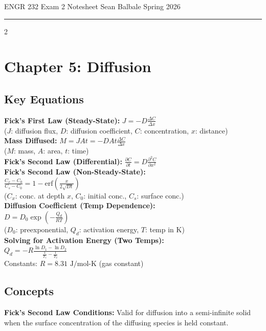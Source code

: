 \documentclass[8pt]{article}
\date{}
\begin{document}
\large ENGR 232 Exam 2 Notesheet \hfill Sean Balbale \hfill Spring 2026 \vspace{0.1cm}
\hrule
\vspace{0.1cm}

\begin{multicols*}{2}

  \section*{Chapter 5: Diffusion}
  \subsection*{Key Equations}
  \textbf{Fick's First Law (Steady-State):} \( J = -D \frac{\Delta C}{\Delta x} \) \\
  (\( J \): diffusion flux, \( D \): diffusion coefficient, \( C \): concentration, \( x \): distance) \\

  \textbf{Mass Diffused:} \( M = JAt = -DAt\frac{\Delta C}{\Delta x} \) \\
  (\( M \): mass, \( A \): area, \( t \): time) \\

  \textbf{Fick's Second Law (Differential):} \( \frac{\partial C}{\partial t} = D \frac{\partial^2 C}{\partial x^2} \) \\

  \textbf{Fick's Second Law (Non-Steady-State):} \\
  \( \frac{C_x - C_0}{C_s - C_0} = 1 - \text{erf}\left(\frac{x}{2\sqrt{Dt}}\right) \) \\
  (\( C_x \): conc. at depth \( x \), \( C_0 \): initial conc., \( C_s \): surface conc.) \\

  \textbf{Diffusion Coefficient (Temp Dependence):} \\
  \( D = D_0 \exp\left(-\frac{Q_d}{RT}\right) \) \\
  (\( D_0 \): preexponential, \( Q_d \): activation energy, \( T \): temp in K) \\

  \textbf{Solving for Activation Energy (Two Temps):} \\
  \( Q_d = -R \frac{\ln D_1 - \ln D_2}{\frac{1}{T_1} - \frac{1}{T_2}} \) \\
  Constants: \( R = 8.31 \text{ J/mol-K} \) (gas constant)

  \subsection*{Concepts}
  \textbf{Fick's Second Law Conditions:} Valid for diffusion into a semi-infinite solid when the surface concentration of the diffusing species is held constant.


\end{multicols*}
\end{document}
